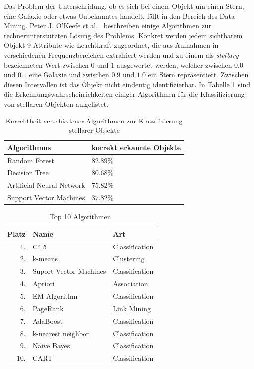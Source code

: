\documentclass[12pt,journal,compsoc]{IEEEtran}
\begin{document}
Das Problem der Unterscheidung, ob es sich bei einem Objekt um einen Stern, eine Galaxie oder etwas Unbekanntes handelt, fällt in den Bereich des Data Mining. Peter J. O'Keefe et al.~\cite{o2009star}
beschreiben einige Algorithmen zur rechnerunterstützten Lösung des Problems. Konkret werden jedem sichtbarem Objekt 9 Attribute wie Leuchtkraft zugeordnet, die aus Aufnahmen in verschiedenen Frequenzbereichen extrahiert werden und zu einem als \emph{stellary} bezeichneten Wert zwischen $0$ und $1$ ausgewertet werden, welcher zwischen $0.0$ und $0.1$ eine Galaxie und zwischen $0.9$ und $1.0$ ein 
Stern repräsentiert. Zwischen diesen Intervallen ist das Objekt nicht eindeutig identifizierbar. In Tabelle \ref{Erkennungswahrscheinlichkeiten} sind die Erkennungswahrscheinlichkeiten einiger 
Algorithmen für die Klassifizierung von stellaren Objekten aufgelistet.


\begin{table}[!t]
\centering
\label{Erkennungswahrscheinlichkeiten}
\caption{Korrektheit verschiedener Algorithmen zur Klassifizierung stellarer Objekte \cite{o2009star}}
\begin{tabular}{l|l}
Algorithmus               & korrekt erkannte Objekte\\ \hline
Random Forest             & $82.89\%$ \\
Decision Tree             & $80.68\%$ \\
Artificial Neural Network & $75.82\%$ \\
Support Vector Machines   & $37.82\%$
\end{tabular}
\end{table}

\begin{table}[!b]
\centering
\caption{Top 10 Algorithmen \cite{wu2008top}}
\begin{tabular}{r|l|l}
Platz & Name & Art\\ \hline
1.& C4.5 & Classification\\
2.& k-means & Clustering\\
3.& Suport Vector Machines & Classification\\
4.& Apriori & Association\\
5.& EM Algorithm & Classification\\
6.& PageRank & Link Mining\\
7.& AdaBoost & Classification\\
8.& k-nearest neighbor & Classification\\
9.& Naive Bayes & Classification\\
10.& CART & Classification
\end{tabular}
\label{top10}
\end{table}
\end{document}
